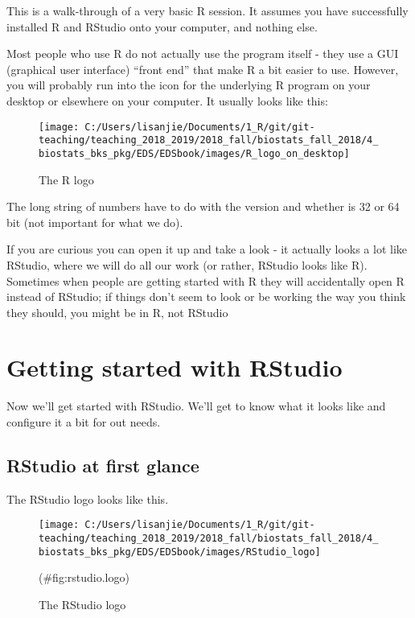 \documentclass[]{book}
\theoremstyle{definition}
\theoremstyle{definition}
\theoremstyle{definition}
\theoremstyle{remark}
\begin{document}
This is a walk-through of a very basic R session. It assumes you have
successfully installed R and RStudio onto your computer, and nothing
else.

Most people who use R do not actually use the program itself - they use
a GUI (graphical user interface) ``front end'' that make R a bit easier
to use. However, you will probably run into the icon for the underlying
R program on your desktop or elsewhere on your computer. It usually
looks like this:

\begin{figure}
\texttt{[image: C:/Users/lisanjie/Documents/1\_R/git/git-teaching/teaching\_2018\_2019/2018\_fall/biostats\_fall\_2018/4\_biostats\_bks\_pkg/EDS/EDSbook/images/R\_logo\_on\_desktop]} \caption{The R logo}\label{fig:unnamed-chunk-1}
\end{figure}

The long string of numbers have to do with the version and whether is 32
or 64 bit (not important for what we do).

If you are curious you can open it up and take a look - it actually
looks a lot like RStudio, where we will do all our work (or rather,
RStudio looks like R). Sometimes when people are getting started with R
they will accidentally open R instead of RStudio; if things don't seem
to look or be working the way you think they should, you might be in R,
not RStudio

\section{Getting started with
RStudio}\label{getting-started-with-rstudio}

Now we'll get started with RStudio. We'll get to know what it looks like
and configure it a bit for out needs.

\subsection{RStudio at first glance}\label{rstudio-at-first-glance}

The RStudio logo looks like this.

\begin{figure}
\texttt{[image: C:/Users/lisanjie/Documents/1\_R/git/git-teaching/teaching\_2018\_2019/2018\_fall/biostats\_fall\_2018/4\_biostats\_bks\_pkg/EDS/EDSbook/images/RStudio\_logo]} \caption{The RStudio logo}(\#fig:rstudio.logo)
\end{figure}
\end{document}
